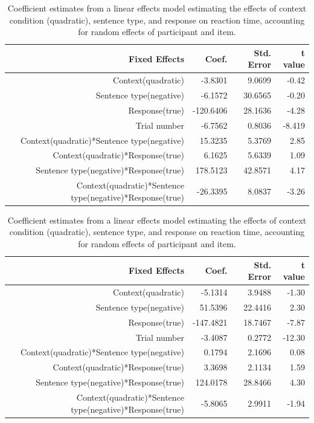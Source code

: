 \documentclass[10pt,letterpaper]{article}
\begin{document}
\begin{table}[t]
\caption{Coefficient estimates from a linear effects model estimating the effects of context condition (quadratic), sentence type, and response on reaction time, accounting for random effects of participant and item.}
\begin{center}
\small\addtolength{\tabcolsep}{-5pt}
\begin{tabular}{ r  r  r  r  } 
\hline
  \bf{Fixed Effects} & \bf{Coef.} & \bf{Std. Error} & \bf{t value} \\ \hline             
Context(quadratic) &-3.8301 & 9.0699 & -0.42\\
Sentence type(negative) &  -6.1572 & 30.6565 & -0.20\\
Response(true) & -120.6406 &   28.1636 &  -4.28\\
Trial number & -6.7562   &  0.8036  & -8.419\\
Context(quadratic)*Sentence type(negative)&15.3235  &   5.3769  &  2.85\\
Context(quadratic)*Response(true) & 6.1625  &   5.6339  &  1.09\\
Sentence type(negative)*Response(true) &  178.5123 &   42.8571  &  4.17\\
Context(quadratic)*Sentence type(negative)*Response(true) & -26.3395  &   8.0837 &  -3.26\\
\hline
\end{tabular}
\end{center}
\end{table}

\begin{table}[t]
\caption{Coefficient estimates from a linear effects model estimating the effects of context condition (quadratic), sentence type, and response on reaction time, accounting for random effects of participant and item.}
\begin{center}
\small\addtolength{\tabcolsep}{-5pt}
\begin{tabular}{ r  r  r  r  } 
\hline
  \bf{Fixed Effects} & \bf{Coef.} & \bf{Std. Error} & \bf{t value} \\ \hline                     
Context(quadratic) & -5.1314   &  3.9488  & -1.30\\
Sentence type(negative) & 51.5396 &   22.4416   & 2.30\\
Response(true) & -147.4821  &  18.7467 &  -7.87\\
Trial number &-3.4087 &    0.2772 &  -12.30 \\
Context(quadratic)*Sentence type(negative)&  0.1794  &   2.1696  &  0.08\\
Context(quadratic)*Response(true) &  3.3698 &    2.1134  &  1.59 \\
Sentence type(negative)*Response(true) &124.0178 &   28.8466 &   4.30  \\
Context(quadratic)*Sentence type(negative)*Response(true) & -5.8065  &   2.9911  & -1.94\\
\hline
\end{tabular}
\end{center}
\end{table}
\end{document}

